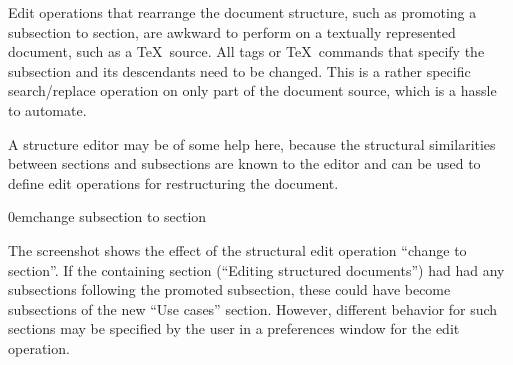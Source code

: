 \documentclass{speauth}
\begin{document}


Edit operations that rearrange the document structure, such as promoting a subsection to section, are awkward to perform on a textually represented document, such as a \TeX\ source. All tags or \TeX\ commands that specify the subsection and its descendants need to be changed. This is a rather specific search/replace operation on only part of the document source, which is a hassle to automate.

A structure editor may be of some help here, because the structural similarities between sections and subsections are known to the editor and can be used to define edit operations for restructuring the document.

{0em}{\small change subsection to section}
 
The screenshot shows the effect of the structural edit operation ``change to section''. If the containing section (``Editing structured documents'') had had any subsections following the promoted subsection, these could have become subsections of the new ``Use cases'' section. However, different behavior for such sections may be specified by the user in a preferences window for the edit operation.
\end{document}
